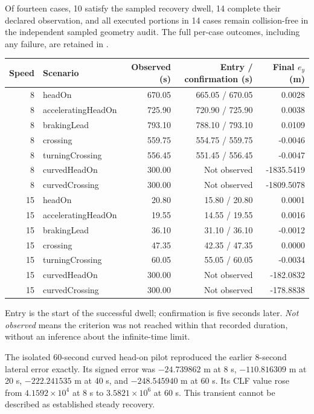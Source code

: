 Of fourteen cases, 10 satisfy the sampled recovery dwell, 14 complete their declared observation, and all executed portions in 14 cases remain collision-free in the independent sampled geometry audit. The full per-case outcomes, including any failure, are retained in .

\begin{longtable}{rlrrr}
\toprule Speed & Scenario & Observed (s) & Entry / confirmation (s) & Final $e_y$ (m)\\\midrule
8 & headOn & 670.05 & 665.05 / 670.05 & 0.0028 \\
8 & acceleratingHeadOn & 725.90 & 720.90 / 725.90 & 0.0038 \\
8 & brakingLead & 793.10 & 788.10 / 793.10 & 0.0109 \\
8 & crossing & 559.75 & 554.75 / 559.75 & -0.0046 \\
8 & turningCrossing & 556.45 & 551.45 / 556.45 & -0.0047 \\
8 & curvedHeadOn & 300.00 & Not observed & -1835.5419 \\
8 & curvedCrossing & 300.00 & Not observed & -1809.5078 \\
15 & headOn & 20.80 & 15.80 / 20.80 & 0.0001 \\
15 & acceleratingHeadOn & 19.55 & 14.55 / 19.55 & 0.0016 \\
15 & brakingLead & 36.10 & 31.10 / 36.10 & -0.0012 \\
15 & crossing & 47.35 & 42.35 / 47.35 & 0.0000 \\
15 & turningCrossing & 60.05 & 55.05 / 60.05 & -0.0034 \\
15 & curvedHeadOn & 300.00 & Not observed & -182.0832 \\
15 & curvedCrossing & 300.00 & Not observed & -178.8838 \\
\bottomrule\end{longtable}
Entry is the start of the successful dwell; confirmation is five seconds later. \emph{Not observed} means the criterion was not reached within that recorded duration, without an inference about the infinite-time limit.

The isolated 60-second curved head-on pilot reproduced the earlier 8-second lateral error exactly. Its signed error was $-24.739862$ m at 8 s, $-110.816309$ m at 20 s, $-222.241535$ m at 40 s, and $-248.545940$ m at 60 s. Its CLF value rose from $4.1592\times10^4$ at 8 s to $3.5821\times10^6$ at 60 s. This transient cannot be described as established steady recovery.
